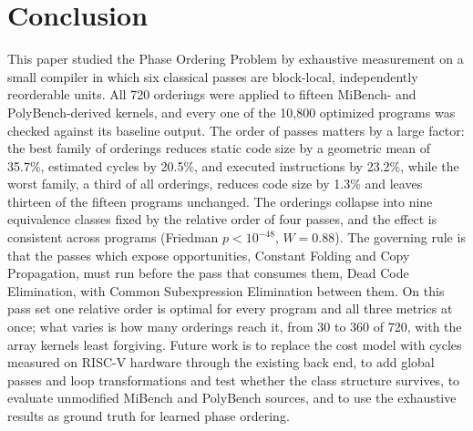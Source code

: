 \documentclass[conference,a4paper]{IEEEtran}
\begin{document}
\section{Conclusion}
This paper studied the Phase Ordering Problem by exhaustive measurement on a small compiler in which six classical passes are block-local, independently reorderable units. All 720 orderings were applied to fifteen MiBench- and PolyBench-derived kernels, and every one of the 10,800 optimized programs was checked against its baseline output. The order of passes matters by a large factor: the best family of orderings reduces static code size by a geometric mean of 35.7\%, estimated cycles by 20.5\%, and executed instructions by 23.2\%, while the worst family, a third of all orderings, reduces code size by 1.3\% and leaves thirteen of the fifteen programs unchanged. The orderings collapse into nine equivalence classes fixed by the relative order of four passes, and the effect is consistent across programs (Friedman $p < 10^{-48}$, $W = 0.88$). The governing rule is that the passes which expose opportunities, Constant Folding and Copy Propagation, must run before the pass that consumes them, Dead Code Elimination, with Common Subexpression Elimination between them. On this pass set one relative order is optimal for every program and all three metrics at once; what varies is how many orderings reach it, from 30 to 360 of 720, with the array kernels least forgiving. Future work is to replace the cost model with cycles measured on RISC-V hardware through the existing back end, to add global passes and loop transformations and test whether the class structure survives, to evaluate unmodified MiBench and PolyBench sources, and to use the exhaustive results as ground truth for learned phase ordering.
\end{document}
